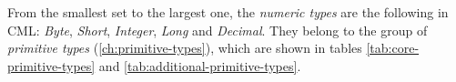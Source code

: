 From the smallest set to the largest one,
the \emph{numeric types} are the following in CML:
\emph{Byte}, \emph{Short}, \emph{Integer}, \emph{Long} and \emph{Decimal}.
They belong to the group of \emph{primitive types} (\ref{ch:primitive-types}),
which are shown in tables \ref{tab:core-primitive-types} and \ref{tab:additional-primitive-types}.
